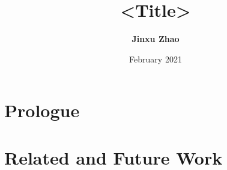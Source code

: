 



\title{<Title>}
\author{\textbf{Jinxu Zhao}}
\date{February 2021}




\maketitle

\begin{abstract}
 
\end{abstract}


\frontmatter
\makedeclaration
\makeAck
\tableofcontents
\listoffigures
\listoftables

\mainmatter

\part{Prologue}





%
%
%
%
%
%
%
%
%







\part{Related and Future Work}

